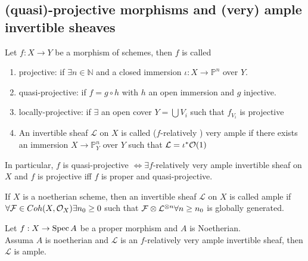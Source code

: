 \documentclass[../main.tex]{subfiles}
\begin{document}
\subsection{(quasi)-projective morphisms and (very) ample invertible sheaves}
\begin{defn}
	Let $f:X\to Y$ be a morphism of schemes, then $f$ is called 
	\begin{enumerate}
	\item projective: if $\exists n \in \mathbb{N}$ and a closed immersion $\iota:X \to \mathbb{P}^{n}$ over $Y$.
	\item quasi-projective: if $f=g \circ h$ with $h$ an open immersion and $g$ injective.
	\item locally-projective: if $\exists$ an open cover $Y= \bigcup V_i$ such that $f_{V_i} $ is projective
	\item An invertible sheaf $ \mathcal{L}$ on $X$ is called ($f$-relatively ) very ample if there exists an immersion $X\to \mathbb{P}^{n}_Y$ over $Y$ such that $ \mathcal{L}= \iota^{\ast}\mathcal{O}( 1) $ 
	\end{enumerate}
\end{defn}
\begin{rmq}
In particular, $f$ is quasi-projective $\iff \exists f$-relatively very ample invertible sheaf on $X$ and $f$ is projective iff $f$ is proper and quasi-projective.
\end{rmq}
\begin{defn}
	If $X$ is a noetherian scheme, then an invertible sheaf $ \mathcal{L}$ on $X$ is called ample if $\forall \mathcal{F}\in Coh( X,\mathcal{O}_X) \exists n_0 \geq 0$ such that $\mathcal{F} \otimes \mathcal{L}^{ \otimes n}\forall n \geq n_0$ is globally generated.
\end{defn}
\begin{thm}[Serre]
Let $f:X \to \operatorname{Spec} A$ be a proper morphism and $A$ is Noetherian.\\
Assuma $A$ is noetherian and $ \mathcal{L}$ is an $f$-relatively very ample invertible sheaf, then $ \mathcal{L}$ is ample.
\end{thm}
\end{document}
